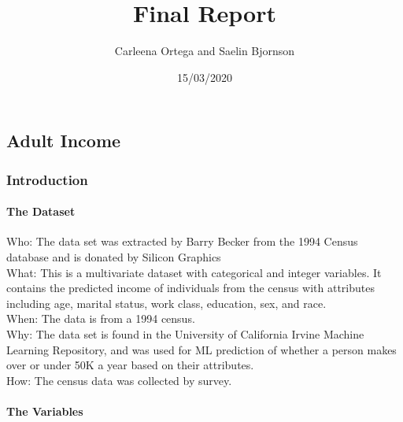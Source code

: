 \documentclass[]{article}
\title{Final Report}
\author{Carleena Ortega and Saelin Bjornson}
\date{15/03/2020}
\let\oldparagraph\paragraph
\renewcommand{\paragraph}[1]{\oldparagraph{#1}\mbox{}}
\begin{document}
\maketitle

{
\setcounter{tocdepth}{4}
\tableofcontents
}
\hypertarget{adult-income}{%
\subsection{Adult Income}\label{adult-income}}

\hypertarget{introduction}{%
\subsubsection{Introduction}\label{introduction}}

\hypertarget{the-dataset}{%
\paragraph{The Dataset}\label{the-dataset}}

Who: The data set was extracted by Barry Becker from the 1994 Census
database and is donated by Silicon Graphics\\
What: This is a multivariate dataset with categorical and integer
variables. It contains the predicted income of individuals from the
census with attributes including age, marital status, work class,
education, sex, and race.\\
When: The data is from a 1994 census.\\
Why: The data set is found in the University of California Irvine
Machine Learning Repository, and was used for ML prediction of whether a
person makes over or under 50K a year based on their attributes.\\
How: The census data was collected by survey.

\hypertarget{the-variables}{%
\paragraph{The Variables}\label{the-variables}}
\end{document}
